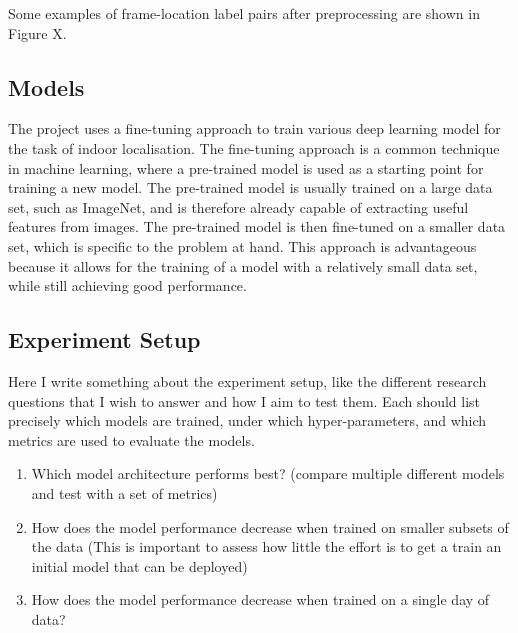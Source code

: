 \documentclass{article}
\begin{document}
  Some examples of frame-location label pairs after preprocessing are shown in
  Figure X.
  

  \subsection{Models} %
  \label{sub:models}

  The project uses a fine-tuning approach to train various deep learning model for
  the task of indoor localisation. The fine-tuning approach is a common
  technique in machine learning, where a pre-trained model is used as a starting
  point for training a new model. The pre-trained model is usually trained on a
  large data set, such as ImageNet, and is therefore
  already capable of extracting useful features from images. The pre-trained
  model is then fine-tuned on a smaller data set, which is specific to the
  problem at hand. This approach is advantageous because it allows for the
  training of a model with a relatively small data set, while still achieving
  good performance.




  \subsection{Experiment Setup} %
  \label{sub:experiment-setup}

  Here I write something about the experiment setup, like the different
  research questions that I wish to answer and how I aim to test them. Each
  should list precisely which models are trained, under which hyper-parameters,
  and which metrics are used to evaluate the models.

  \begin{enumerate}
    \item Which model architecture performs best? (compare multiple different
      models and test with a set of metrics)
    \item How does the model performance decrease when trained on smaller
      subsets of the data (This is important to assess how little the effort is
      to get a train an initial model that can be deployed)
    \item How does the model performance decrease when trained on a single day
      of data?
  \end{enumerate}
  
\end{document}
